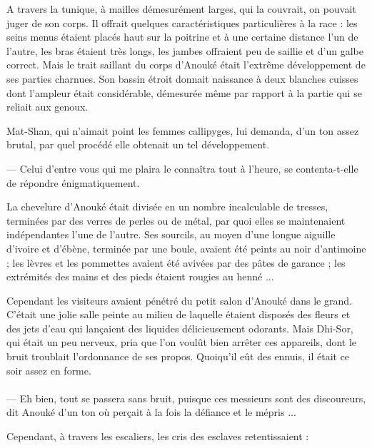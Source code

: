 \documentclass[a4paper, 11pt, oneside, polutonikogreek, french]{article}
\begin{document}
A travers la tunique, à mailles démesurément larges, qui la couvrait, on pouvait juger de son corps. Il offrait quelques caractéristiques particulières à la race : les seins menus étaient placés haut sur la poitrine et à une certaine distance l'un de l'autre, les bras étaient très longs, les jambes offraient peu de saillie et d'un galbe correct. Mais le trait saillant du corps d'Anouké était l'extrême développement de ses parties charnues. Son bassin étroit donnait naissance à deux blanches cuisses dont l'ampleur était considérable, démesurée même par rapport à la partie qui se reliait aux genoux.

Mat-Shan, qui n'aimait point les femmes callipyges, lui demanda, d'un ton assez brutal, par quel procédé elle obtenait un tel développement.

--- Celui d'entre vous qui me plaira le connaîtra tout à l'heure, se contenta-t-elle de répondre énigmatiquement.

La chevelure d'Anouké était divisée en un nombre incalculable de tresses, terminées par des verres de perles ou de métal, par quoi elles se maintenaient indépendantes l'une de l'autre. Ses sourcils, au moyen d'une longue aiguille d'ivoire et d'ébène, terminée par une boule, avaient été peints au noir d'antimoine ; les lèvres et les pommettes avaient été avivées par des pâtes de garance ; les extrémités des mains et des pieds étaient rougies au henné ...

\bigskip
\centerline{\EightStarTaper}
\centerline{\EightStarTaper\EightStarTaper}
\bigskip

Cependant les visiteurs avaient pénétré du petit salon d'Anouké dans le grand. C'était une jolie salle peinte au milieu de laquelle étaient disposés des fleurs et des jets d'eau qui lançaient des liquides délicieusement odorants. Mais Dhi-Sor, qui était un peu nerveux, pria que l'on voulût bien arrêter ces appareils, dont le bruit troublait l'ordonnance de ses propos. Quoiqu'il eût des ennuis, il était ce soir assez en forme.
\clearpage
\paragraph{}
--- Eh bien, tout se passera sans bruit, puisque ces messieurs sont des discoureurs, dit Anouké d'un ton où perçait à la fois la défiance et le mépris ...

\bigskip
\centerline{\EightStarTaper}
\centerline{\EightStarTaper\EightStarTaper}
\bigskip

Cependant, à travers les escaliers, les cris des esclaves retentissaient :
\end{document}
